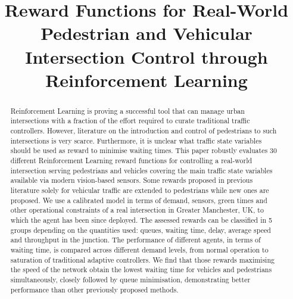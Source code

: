 \documentclass[a4paper, conference]{IEEEtran}
\begin{document}
\title{Reward Functions for Real-World Pedestrian and Vehicular Intersection Control through Reinforcement Learning}

\author{
\and
{}
}

\maketitle

\begin{abstract}
Reinforcement Learning is proving a successful tool that can manage urban intersections with a fraction of the effort required to curate traditional traffic controllers.
However, literature on the introduction and control of pedestrians to such intersections is very scarce.
Furthermore, it is unclear what traffic state variables should be used as reward to minimise waiting times.
This paper robustly evaluates 30 different Reinforcement Learning reward functions for controlling a real-world intersection serving pedestrians and vehicles covering the main traffic state variables available via modern vision-based sensors.
Some rewards proposed in previous literature solely for vehicular traffic are extended to pedestrians while new ones are proposed.
We use a calibrated model in terms of demand, sensors, green times and other operational constraints of a real intersection in Greater Manchester, UK, to which the agent has been since deployed.
The assessed rewards can be classified in 5 groups depending on the quantities used: queues, waiting time, delay, average speed and throughput in the junction.
The performance of different agents, in terms of waiting time, is compared across different demand levels, from normal operation to saturation of traditional adaptive controllers.
We find that those rewards maximising the speed of the network obtain the lowest waiting time for vehicles and pedestrians simultaneously, closely followed by queue minimisation, demonstrating better performance than other previously proposed methods.
\end{abstract}
\end{document}
